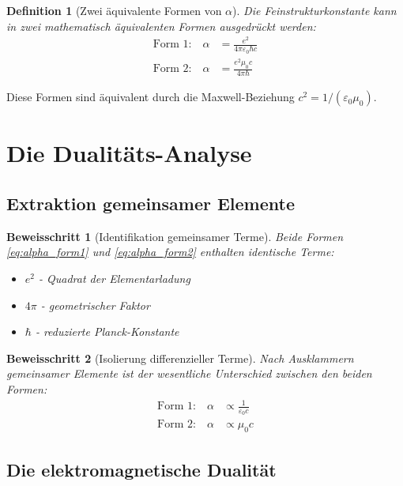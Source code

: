 \documentclass[12pt,a4paper]{article}
\newcommand{\alphaem}{\alpha}
\newtheorem{definition}[theorem]{Definition}
\newtheorem{proof_step}{Beweisschritt}[section]
\begin{document}
	\begin{definition}[Zwei äquivalente Formen von $\alpha$]
		Die Feinstrukturkonstante kann in zwei mathematisch äquivalenten Formen ausgedrückt werden:
		\begin{align}
			\text{Form 1:} \quad \alphaem &= \frac{e^2}{4\pi\varepsilon_0\hbar c} \label{eq:alpha_form1}\\
			\text{Form 2:} \quad \alphaem &= \frac{e^2 \mu_0 c}{4\pi \hbar} \label{eq:alpha_form2}
		\end{align}
	\end{definition}
	
	Diese Formen sind äquivalent durch die Maxwell-Beziehung $c^2 = 1/(\varepsilon_0\mu_0)$.
	
	\section{Die Dualitäts-Analyse}
	
	\subsection{Extraktion gemeinsamer Elemente}
	
	\begin{proof_step}[Identifikation gemeinsamer Terme]
		Beide Formen \eqref{eq:alpha_form1} und \eqref{eq:alpha_form2} enthalten identische Terme:
		\begin{itemize}
			\item $e^2$ - Quadrat der Elementarladung
			\item $4\pi$ - geometrischer Faktor
			\item $\hbar$ - reduzierte Planck-Konstante
		\end{itemize}
	\end{proof_step}
	
	\begin{proof_step}[Isolierung differenzieller Terme]
		Nach Ausklammern gemeinsamer Elemente ist der wesentliche Unterschied zwischen den beiden Formen:
		\begin{align}
			\text{Form 1:} \quad \alphaem &\propto \frac{1}{\varepsilon_0 c} \label{eq:diff1}\\
			\text{Form 2:} \quad \alphaem &\propto \mu_0 c \label{eq:diff2}
		\end{align}
	\end{proof_step}
	
	\subsection{Die elektromagnetische Dualität}
	
\end{document}
